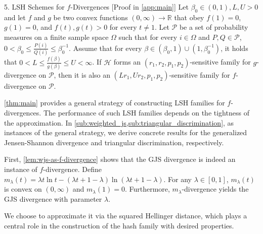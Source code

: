 \documentclass[final]{beamer}
\newlength{\onecolwid}
\begin{document}
\begin{frame}[t]
\begin{columns}[t]
\begin{column}{\onecolwid}
\begin{block}{5. LSH Schemes for $ f $-Divergences}
		[{Proof in \cref{app:main}}]\label{thm:main}
			Let $ \beta_0\in (0,1),L,U>0 $ and let $ f $ and $ g $ be two 
			convex 
			functions $ 
			(0,\infty)\to \mathbb{R} $ 
			that obey $ f(1)=0 $, $ g(1)=0 $, and $f(t), g(t)>0 $ for every $ 
			t\ne 1 
			$. 
			Let $ \mathcal{P} $ be a set of probability measures
			on a  finite sample space $ \Omega $ such that for every $ i\in 
			\Omega $ and $ 
			P, Q\in \mathcal{P} $, $
			0< \beta_0\le \frac{P(i)}{Q(i)} \le \beta_0^{-1}
			$.
			Assume that for every $ \beta\in 
			(\beta_0, 1)\cup (1,\beta_0^{-1}) $, it holds that
			$
			0<L\le \frac{f(\beta)}{g(\beta)} \le U < \infty$.
			If $ \mathcal{H} $ forms 
			an $ (r_1, r_2, p_1,p_2) $-sensitive family for $ 
			g 
			$-divergence on $ \mathcal{P} $, then it is also an  
			$ (Lr_1, 
			Ur_2, p_1,p_2)  
			$-sensitive family for $ f $-divergence on $ \mathcal{P} $.
		
		
		\cref{thm:main} provides a general strategy of constructing LSH 
		families for $ 
		f $-divergences. The performance of such LSH families depends on the 
		tightness 
		of 
		the approximation. 
		In \cref{sub:weighted_js,sub:triangular_discrimination}, as instances 
		of the 
		general strategy, we derive concrete 
		results for the generalized Jensen-Shannon 
		divergence and triangular discrimination, respectively.
		
		\label{sub:weighted_js}
		First, \cref{lem:wjs-as-f-divergence} shows that the GJS divergence is 
		indeed 
		an 
		instance of $ f $-divergence.
			Define 
			$	m_\lambda(t) = \lambda t \ln t - (\lambda t + 1 - 
			\lambda)\ln(\lambda t+1-\lambda)$.
			For any $ \lambda\in[0,1] $, $ m_\lambda(t) $ is convex on $ 
			(0,\infty) $ 
			and $ m_\lambda(1)=0 $. Furthermore, $ m_\lambda $-divergence 
			yields the 
			GJS divergence with parameter $ \lambda $.
		
		We choose to approximate it via the squared Hellinger distance, which 
		plays a central role in the construction of the hash family with 
		desired 
		properties.
		

\end{block}
\end{column}
\end{columns}
\end{frame}
\end{document}
